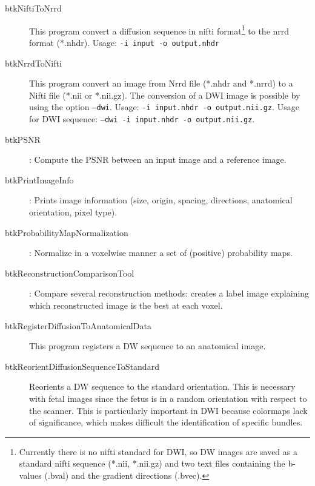 \begin{description}
\item[btkNiftiToNrrd] This program convert a diffusion sequence in nifti
format\footnote{Currently there is no nifti standard for DWI, so DW images are
saved as a standard nifti sequence (*.nii, *.nii.gz) and two text files
containing the b-values (.bval) and the gradient directions (.bvec).}  to the
nrrd format (*.nhdr). Usage: \texttt{-i input -o output.nhdr}

\item[btkNrrdToNifti] This program convert an image from Nrrd file (*.nhdr and *.nrrd) to a Nifti file (*.nii or *.nii.gz). The conversion of a DWI image is possible by using the option \texttt{--dwi}. Usage: \texttt{-i input.nhdr -o output.nii.gz}. Usage for DWI sequence: \texttt{--dwi -i input.nhdr -o output.nii.gz}.
\item[btkPSNR]: Compute the PSNR between an input image and a reference image.
\item[btkPrintImageInfo]: Prints image information (size, origin, spacing, directions, anatomical orientation, pixel type).
\item[btkProbabilityMapNormalization]: Normalize in a voxelwise manner a set of (positive) probability maps. 
\item[btkReconstructionComparisonTool]: Compare several reconstruction methods: creates a label image explaining which reconstructed image is the best at each voxel.
\item[btkRegisterDiffusionToAnatomicalData] This program registers a DW
sequence to an anatomical image. 

\item[btkReorientDiffusionSequenceToStandard] Reorients a DW sequence
to the standard orientation. This is necessary with fetal images since the fetus
is in a random orientation with respect to the scanner. This is particularly
important in DWI because colormaps lack of significance, which makes difficult
the identification of specific bundles.


\end{description}
